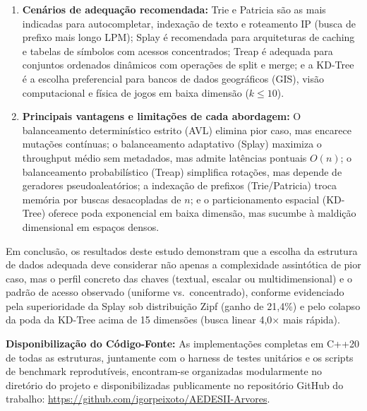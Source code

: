 \documentclass[11pt,a4paper]{article}
\newcommand{\Ogrande}[1]{\ensuremath{O\!\left(#1\right)}}
\begin{document}
\begin{enumerate}[leftmargin=*]
  \item \textbf{Cenários de adequação recomendada:} Trie e Patricia são as mais indicadas para autocompletar, indexação de texto e roteamento IP (busca de prefixo mais longo LPM); Splay é recomendada para arquiteturas de caching e tabelas de símbolos com acessos concentrados; Treap é adequada para conjuntos ordenados dinâmicos com operações de split e merge; e a KD-Tree é a escolha preferencial para bancos de dados geográficos (GIS), visão computacional e física de jogos em baixa dimensão ($k \le 10$).
  \item \textbf{Principais vantagens e limitações de cada abordagem:} O balanceamento determinístico estrito (AVL) elimina pior caso, mas encarece mutações contínuas; o balanceamento adaptativo (Splay) maximiza o throughput médio sem metadados, mas admite latências pontuais $\Ogrande{n}$; o balanceamento probabilístico (Treap) simplifica rotações, mas depende de geradores pseudoaleatórios; a indexação de prefixos (Trie/Patricia) troca memória por buscas desacopladas de $n$; e o particionamento espacial (KD-Tree) oferece poda exponencial em baixa dimensão, mas sucumbe à maldição dimensional em espaços densos.
\end{enumerate}

Em conclusão, os resultados deste estudo demonstram que a escolha da estrutura de dados adequada deve considerar não apenas a complexidade assintótica de pior caso, mas o perfil concreto das chaves (textual, escalar ou multidimensional) e o padrão de acesso observado (uniforme vs.\ concentrado), conforme evidenciado pela superioridade da Splay sob distribuição Zipf (ganho de 21,4\%) e pelo colapso da poda da KD-Tree acima de 15 dimensões (busca linear 4,0$\times$ mais rápida).

\vspace{0.05cm}
\noindent\textbf{Disponibilização do Código-Fonte:} As implementações completas em C++20 de todas as estruturas, juntamente com o harness de testes unitários e os scripts de benchmark reprodutíveis, encontram-se organizadas modularmente no diretório do projeto e disponibilizadas publicamente no repositório GitHub do trabalho: \url{https://github.com/igorpeixoto/AEDESII-Arvores}.
\end{document}
